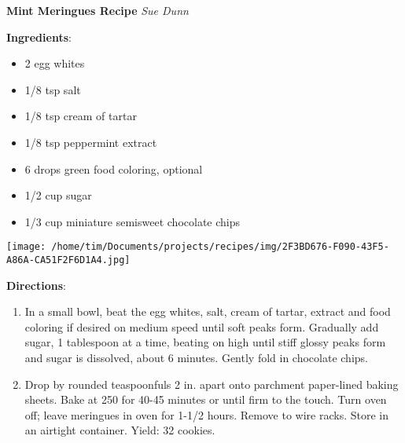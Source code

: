 \documentclass[11pt, twoside, openany]{book}
\begin{document}
\noindent\begin{minipage}[t]{\linewidth}%
{\Large\textbf{Mint Meringues Recipe}} \label{mint-meringues-recipe}\hfill\textit{Sue Dunn}\\
\noindent\begin{minipage}[t]{0.78\linewidth}%
\textbf{Ingredients}:\vspace{-3mm}
\begin{multicols}{2}
\begin{itemize}\setlength\itemsep{-1mm}
\item 2 egg whites
\item 1/8 tsp salt
\item 1/8 tsp cream of tartar
\item 1/8 tsp peppermint extract
\item 6 drops green food coloring, optional
\item 1/2 cup sugar
\item 1/3 cup miniature semisweet chocolate chips
\end{itemize}
\end{multicols}
\end{minipage}
\noindent\begin{minipage}[t]{0.18\linewidth}
\centering \strut\vspace*{-\baselineskip}\newline
\texttt{[image: /home/tim/Documents/projects/recipes/img/2F3BD676-F090-43F5-A86A-CA51F2F6D1A4.jpg]}\\
\end{minipage}\vspace{3mm}
\textbf{Directions}:
\vspace{-3mm}\begin{enumerate}\setlength\itemsep{-1mm}
\item In a small bowl, beat the egg whites, salt, cream of tartar, extract and food coloring if desired on medium speed until soft peaks form. Gradually add sugar, 1 tablespoon at a time, beating on high until stiff glossy peaks form and sugar is dissolved, about 6 minutes. Gently fold in chocolate chips.
\item Drop by rounded teaspoonfuls 2 in. apart onto parchment paper-lined baking sheets. Bake at 250 for 40-45 minutes or until firm to the touch. Turn oven off; leave meringues in oven for 1-1/2 hours. Remove to wire racks. Store in an airtight container. Yield: 32 cookies.
\end{enumerate}
\end{minipage}\vspace{8mm}
\end{document}
